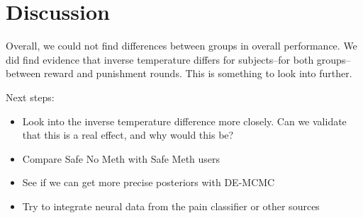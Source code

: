 \documentclass{article}\usepackage[]{graphicx}\usepackage[]{color}
\begin{document}
\section*{Discussion}

Overall, we could not find differences between groups in overall performance. We did find evidence that inverse temperature differs for subjects--for both groups--between reward and punishment rounds. This is something to look into further.

Next steps:
\begin{itemize}
  \item Look into the inverse temperature difference more closely. Can we validate that this is a real effect, and why would this be?
  \item Compare Safe No Meth with Safe Meth users
  \item See if we can get more precise posteriors with DE-MCMC
  \item Try to integrate neural data from the pain classifier or other sources
\end{itemize}
\end{document}
